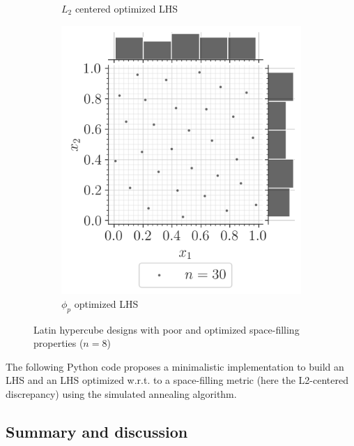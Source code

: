 \begin{figure}[ht]
\begin{subfigure}[b]{0.32\textwidth}
        \caption{$L_2$ centered optimized LHS}
    \end{subfigure}
    \hfill
    \begin{subfigure}[b]{0.32\textwidth}
        \centering
        \includegraphics[width=\textwidth]{../numerical_experiments/chapter1/figures/optimized_phip_LHS.png}
        \caption{$\phi_p$ optimized LHS}
    \end{subfigure}
       \caption{Latin hypercube designs with poor and optimized space-filling properties ($n=8$)}
       \label{fig:LHS_designs}
\end{figure}


\begin{otexample}
    The following Python code proposes a minimalistic \ot implementation to build an LHS and 
    an LHS optimized w.r.t. to a space-filling metric (here the L2-centered discrepancy) using the simulated annealing algorithm. 
\end{otexample}


\subsection{Summary and discussion}


